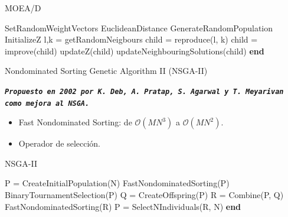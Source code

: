 \documentclass[12pt]{beamer}
\begin{document}
\begin{frame}[fragile]{MOEA/D}
\begin{algorithm}[H]
\begin{algorithmic}[1]
  \State SetRandomWeightVectors\;
  \State EuclideanDistance\;
  \State GenerateRandomPopulation\;
  \State InitializeZ\;
      \State l,k = getRandomNeigbours\;
      \State child = reproduce(l, k)\;
      \State child = improve(child)\;
      \State updateZ(child)\;
      \State updateNeighbouringSolutions(child)\;
    \EndFor 
    \EndWhile
    \State \textbf{end}
\end{algorithmic}
\caption{MOEA/D.}
\end{algorithm}
\end{frame}


\begin{frame}[fragile]{Nondominated Sorting Genetic Algorithm II (NSGA-II)}
\begin{center}
        \texttt{\textbf{\textit{Propuesto en 2002 por K. Deb, A. Pratap, S. Agarwal y T. Meyarivan como mejora al NSGA\cite{996017}.}}}
\end{center}
\begin{itemize}
    \item Fast Nondominated Sorting: de $\mathcal{O}(MN^{3})$ a $\mathcal{O}(MN^{2})$.
    \item Operador de selección.
\end{itemize}
\end{frame}
\begin{frame}[fragile]{NSGA-II}
\begin{algorithm}[H]
\begin{algorithmic}[1]
\State P = CreateInitialPopulation(N)\;
\State  FastNondominatedSorting(P)\;
    \State BinaryTournamentSelection(P)\;
    \State Q = CreateOffspring(P)\;
    \State R = Combine(P, Q)\;
    \State FastNondominatedSorting(R)\;
    \State P = SelectNIndividuals(R, N)\;
  \EndWhile
  \State \textbf{end}
\end{algorithmic}
\caption{NSGA-II.}
\end{algorithm}
\end{frame}
\end{document}
